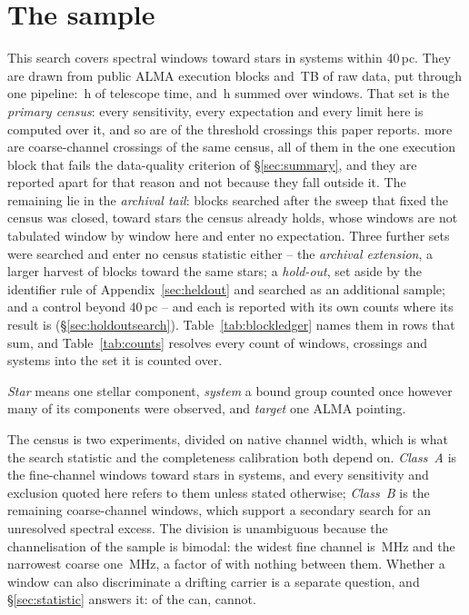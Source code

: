 \section{The sample}
\label{sec:sample}

This search covers \NWindows{} spectral windows toward \NStars{} stars in
\NSystems{} systems within 40\,pc. They are drawn from \NEB{} public ALMA
execution blocks and \TotalDataTB\,TB of raw data, put through one
pipeline: \StTelHours\,h of telescope time, and \LdgCensusHours\,h summed
over windows. That set is the \emph{primary census}: every
sensitivity, every expectation and every limit here is computed over it, and
so are \MtCrossACen{} of the \EvNCrossRaw{} threshold crossings this paper
reports. \LdgNCrossB{} more are coarse-channel crossings of the same census,
all of them in the one execution block that fails the data-quality criterion
of \S\ref{sec:summary}, and they are reported apart for that reason and not
because they fall outside it. The remaining \CeNTailCross{} lie in the
\emph{archival tail}: blocks searched after the sweep that fixed the census
was closed, toward stars the census already holds, whose windows are not
tabulated window by window here and enter no expectation. Three further sets
were searched and enter no census statistic either -- the \emph{archival
extension}, a larger harvest of blocks toward the same stars; a
\emph{hold-out}, set aside by the identifier rule of
Appendix~\ref{sec:heldout} and searched as an additional sample; and a
control beyond 40\,pc -- and each is reported with its own counts where its
result is (\S\ref{sec:holdoutsearch}).
Table~\ref{tab:blockledger} names them in rows that sum, and
Table~\ref{tab:counts} resolves every count of windows, crossings and systems
into the set it is counted over.

\emph{Star} means one stellar component, \emph{system} a bound group
counted once however many of its components were observed, and \emph{target}
one ALMA pointing.

The census is two experiments, divided on native channel width, which is
what the search statistic and the completeness calibration both depend on.
\emph{Class~A} is the \NWinA{} fine-channel windows toward
\LdgClassAStars{} stars in \NSysClassA{} systems, and every sensitivity and
exclusion quoted here refers to them unless stated otherwise;
\emph{Class~B} is the remaining \NWinB{} coarse-channel windows, which
support a secondary search for an unresolved spectral excess. The division
is unambiguous because the channelisation of the sample is bimodal: the
widest fine channel is \ScChanFineMaxMHz\,MHz and the narrowest coarse one
\ScChanCoarseMinMHz\,MHz, a factor of \ScChanGapFac{} with nothing between
them. Whether a window can also discriminate a drifting carrier is a
separate question, and \S\ref{sec:statistic} answers it: \EtaDriftAOk{} of
the \NWinA{} can, \EtaDriftALo{} cannot.

